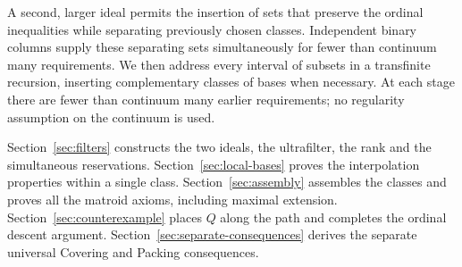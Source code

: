 A second, larger ideal permits the insertion of sets that preserve the
ordinal inequalities while separating previously chosen classes.
Independent binary columns supply these separating sets simultaneously
for fewer than continuum many requirements. We then address every
interval of subsets in a transfinite recursion, inserting complementary
classes of bases when necessary. At each stage there are fewer than
continuum many earlier requirements; no regularity assumption on the
continuum is used.

Section~\ref{sec:filters} constructs the two ideals, the ultrafilter, the
rank and the simultaneous reservations. Section~\ref{sec:local-bases}
proves the interpolation properties within a single class.
Section~\ref{sec:assembly} assembles the classes and proves all the
matroid axioms, including maximal extension.
Section~\ref{sec:counterexample} places $Q$ along the path and completes
the ordinal descent argument. Section~\ref{sec:separate-consequences}
derives the separate universal Covering and Packing consequences.
